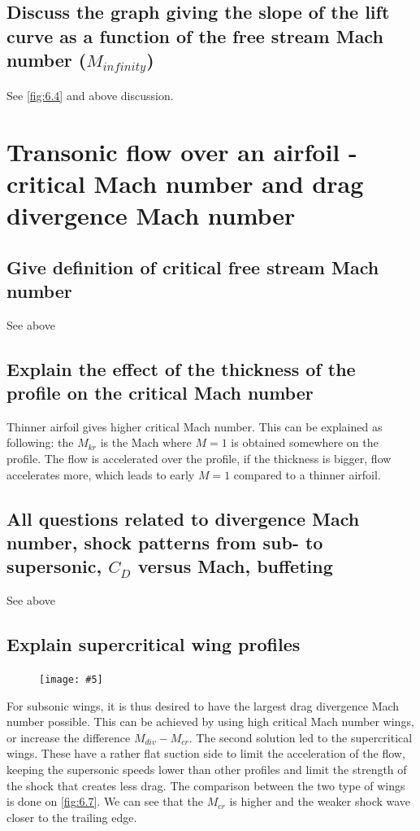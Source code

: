 \documentclass[british,french,11pt, a4paper, openany]{article}
\newcommand{\wrapfig}[6]{%
	\begin{figure}%
		\vspace{-5mm}%
		\texttt{[image: \#5]}%
		\captionof{figure}{}%
		\label{#6}%
	\end{figure}%
}
\begin{document}
\subsection{Discuss the graph giving the slope of the lift curve as a function of the free stream Mach number ($M_{infinity}$)}

See \autoref{fig:6.4} and above discussion.



\section{Transonic flow over an airfoil - critical Mach number and drag divergence Mach	number}
\subsection{Give definition of critical free stream Mach number}
See above

\subsection{Explain the effect of the thickness of the profile on the critical Mach number}
Thinner airfoil gives higher critical Mach number. This can be explained as following: the $M_{kr}$ is the Mach where $M=1$ is obtained somewhere on the profile. The flow is accelerated over the profile, if the thickness is bigger, flow accelerates more, which leads to early $M=1$ compared to a thinner airfoil.

\subsection{All questions related to divergence Mach number, shock patterns from sub- to supersonic, $C_D$ versus Mach, buffeting}
See above

\subsection{Explain supercritical wing profiles}

\wrapfig{16}{l}{9.5}{0.15}{ch6/7}{fig:6.7}
For subsonic wings, it is thus desired to have the largest drag divergence Mach number possible. This can be achieved by using high critical Mach number wings, or increase the difference  $M_{div} -M_{cr}$. The second solution led to the supercritical wings. These have a rather flat suction side to limit the acceleration of the flow, keeping the supersonic speeds lower than other profiles and limit the strength of the shock that creates less drag. The comparison between the two type of wings is done on \autoref{fig:6.7}. We can see that the $M_{cr}$ is higher and the weaker shock wave closer to the trailing edge. 
\end{document}
